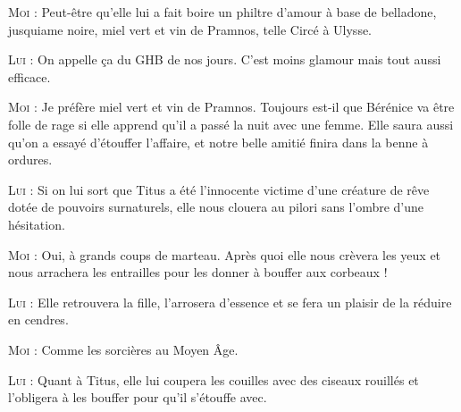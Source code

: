 \begin{dialogue}
\textsc{Moi} : Peut-être qu’elle lui a fait boire un philtre d’amour à base de belladone, jusquiame noire, miel vert et vin de Pramnos, telle Circé à Ulysse.

\textsc{Lui} : On appelle ça du GHB de nos jours. C’est moins glamour mais tout aussi efficace.

\textsc{Moi} : Je préfère miel vert et vin de Pramnos. Toujours est-il que Bérénice va être folle de rage si elle apprend qu’il a passé la nuit avec une femme. Elle saura aussi qu’on a essayé d’étouffer l’affaire, et notre belle amitié finira dans la benne à ordures.

\textsc{Lui} : Si on lui sort que Titus a été l’innocente victime d’une créature de rêve dotée de pouvoirs surnaturels, elle nous clouera au pilori sans l’ombre d’une hésitation.

\textsc{Moi} : Oui, à grands coups de marteau. Après quoi elle nous crèvera les yeux et nous arrachera les entrailles pour les donner à bouffer aux corbeaux !

\textsc{Lui} : Elle retrouvera la fille, l’arrosera d’essence et se fera un plaisir de la réduire en cendres.

\textsc{Moi} : Comme les sorcières au Moyen Âge.

\textsc{Lui} : Quant à Titus, elle lui coupera les couilles avec des ciseaux rouillés et l’obligera à les bouffer pour qu’il s’étouffe avec.


\end{dialogue}
